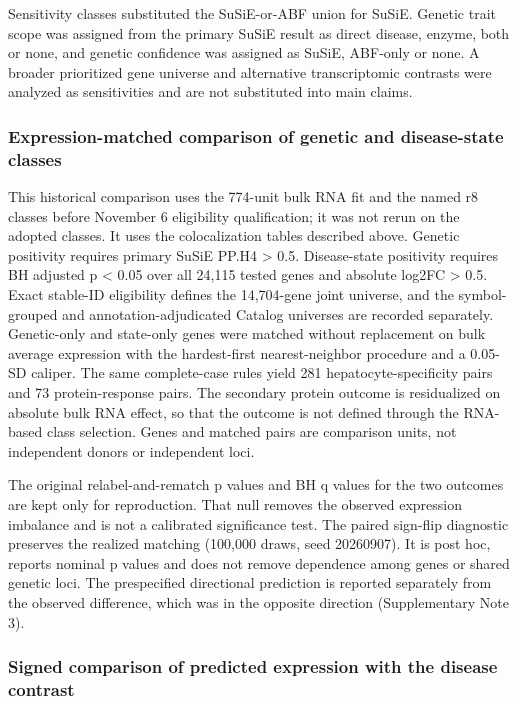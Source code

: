 Sensitivity classes substituted the SuSiE-or-ABF union for SuSiE. Genetic trait scope was assigned from the primary SuSiE result as direct disease, enzyme, both or none, and genetic confidence was assigned as SuSiE, ABF-only or none. A broader prioritized gene universe and alternative transcriptomic contrasts were analyzed as sensitivities and are not substituted into main claims.

\subsubsection{Expression-matched comparison of genetic and disease-state classes}\label{expression-matched-comparison-of-genetic-and-disease-state-classes}

This historical comparison uses the 774-unit bulk RNA fit and the named r8 classes before November 6 eligibility qualification; it was not rerun on the adopted classes. It uses the colocalization tables described above. Genetic positivity requires primary SuSiE PP.H4 \textgreater{} 0.5. Disease-state positivity requires BH adjusted p \textless{} 0.05 over all 24,115 tested genes and absolute log2FC \textgreater{} 0.5. Exact stable-ID eligibility defines the 14,704-gene joint universe, and the symbol-grouped and annotation-adjudicated Catalog universes are recorded separately. Genetic-only and state-only genes were matched without replacement on bulk average expression with the hardest-first nearest-neighbor procedure and a 0.05-SD caliper. The same complete-case rules yield 281 hepatocyte-specificity pairs and 73 protein-response pairs. The secondary protein outcome is residualized on absolute bulk RNA effect, so that the outcome is not defined through the RNA-based class selection. Genes and matched pairs are comparison units, not independent donors or independent loci.

The original relabel-and-rematch p values and BH q values for the two outcomes are kept only for reproduction. That null removes the observed expression imbalance and is not a calibrated significance test. The paired sign-flip diagnostic preserves the realized matching (100,000 draws, seed 20260907). It is post hoc, reports nominal p values and does not remove dependence among genes or shared genetic loci. The prespecified directional prediction is reported separately from the observed difference, which was in the opposite direction (Supplementary Note 3).

\subsubsection{Signed comparison of predicted expression with the disease contrast}\label{signed-comparison-of-predicted-expression-with-the-disease-contrast}

